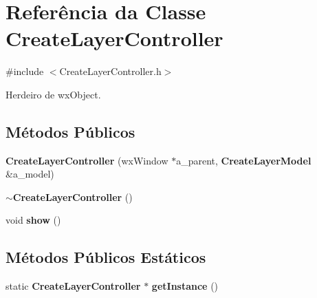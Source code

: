 \section{Referência da Classe Create\+Layer\+Controller}
\label{class_create_layer_controller}


{\ttfamily \#include $<$Create\+Layer\+Controller.\+h$>$}



Herdeiro de wx\+Object.

\subsection*{Métodos Públicos}
\begin{DoxyCompactItemize}
\item 
{\bf Create\+Layer\+Controller} (wx\+Window $\ast$a\+\_\+parent, {\bf Create\+Layer\+Model} \&a\+\_\+model)
\item 
{\bf $\sim$\+Create\+Layer\+Controller} ()
\item 
void {\bf show} ()
\end{DoxyCompactItemize}
\subsection*{Métodos Públicos Estáticos}
\begin{DoxyCompactItemize}
\item 
static {\bf Create\+Layer\+Controller} $\ast$ {\bf get\+Instance} ()
\end{DoxyCompactItemize}
